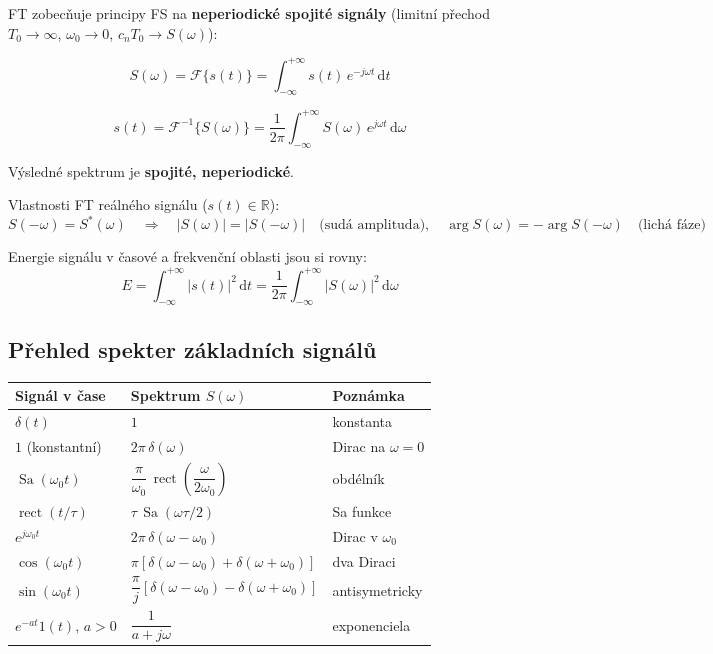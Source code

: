 \documentclass[12pt,a4paper]{article}
\newcommand{\FT}{\mathcal{F}}
\newcommand{\rect}{\operatorname{rect}}
\newcommand{\dd}{\mathrm{d}}
\begin{document}
FT zobecňuje principy FS na \textbf{neperiodické spojité signály} (limitní přechod $T_0 \to \infty$, $\omega_0 \to 0$, $c_n T_0 \to S(\omega)$):

\begin{matBox}
\[
  S(\omega) = \FT\{s(t)\} = \int_{-\infty}^{+\infty} s(t)\, e^{-j\omega t}\,\dd t
\]
\end{matBox}

\begin{matBox}
\[
  s(t) = \FT^{-1}\{S(\omega)\} = \frac{1}{2\pi}\int_{-\infty}^{+\infty} S(\omega)\, e^{j\omega t}\,\dd\omega
\]
\end{matBox}

Výsledné spektrum je \textbf{spojité, neperiodické}.

Vlastnosti FT reálného signálu ($s(t) \in \mathbb{R}$):
\[
  S(-\omega) = S^*(\omega)
  \quad\Rightarrow\quad
  |S(\omega)| = |S(-\omega)| \quad \text{(sudá amplituda)},
  \quad
  \arg S(\omega) = -\arg S(-\omega) \quad \text{(lichá fáze)}
\]

\begin{noteBox}
Energie signálu v časové a frekvenční oblasti jsou si rovny:
\[
  E = \int_{-\infty}^{+\infty}|s(t)|^2\,\dd t = \frac{1}{2\pi}\int_{-\infty}^{+\infty}|S(\omega)|^2\,\dd\omega
\]
\end{noteBox}

\begin{hvezdBox}
\subsection*{Přehled spekter základních signálů}
\end{hvezdBox}

\begin{center}
\begin{tabular}{lll}
\toprule
\textbf{Signál v čase} & \textbf{Spektrum} $S(\omega)$ & \textbf{Poznámka} \\
\midrule
$\delta(t)$ & $1$ & konstanta \\
$1$ (konstantní) & $2\pi\,\delta(\omega)$ & Dirac na $\omega=0$ \\
$\operatorname{Sa}(\omega_0 t)$ & $\dfrac{\pi}{\omega_0}\,\rect\!\left(\dfrac{\omega}{2\omega_0}\right)$ & obdélník \\
$\rect(t/\tau)$ & $\tau\,\operatorname{Sa}(\omega\tau/2)$ & Sa funkce \\
$e^{j\omega_0 t}$ & $2\pi\,\delta(\omega-\omega_0)$ & Dirac v $\omega_0$ \\
$\cos(\omega_0 t)$ & $\pi[\delta(\omega-\omega_0)+\delta(\omega+\omega_0)]$ & dva Diraci \\
$\sin(\omega_0 t)$ & $\dfrac{\pi}{j}[\delta(\omega-\omega_0)-\delta(\omega+\omega_0)]$ & antisymetricky \\
$e^{-at}1(t)$, $a>0$ & $\dfrac{1}{a+j\omega}$ & exponenciela \\
\bottomrule
\end{tabular}
\end{center}
\end{document}
